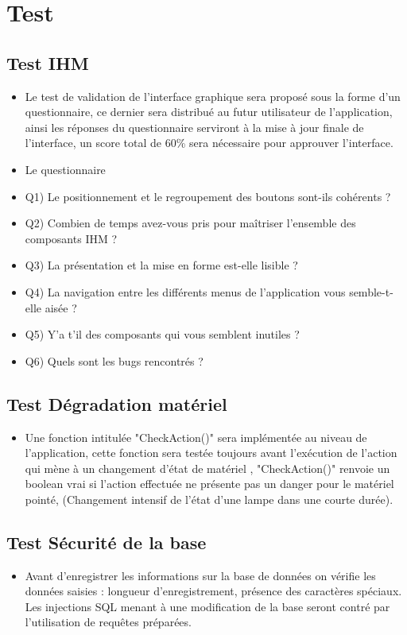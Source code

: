 \documentclass[12pt,a4paper]{article}
\begin{document}
\section{Test}

\subsection {Test IHM}

\begin{itemize}

  \item Le test de validation de l'interface graphique sera proposé sous la forme d'un questionnaire, ce dernier sera distribué au futur utilisateur de l'application, ainsi les réponses du questionnaire serviront à la mise à jour finale de l'interface, un score total de 60\% sera nécessaire pour approuver l'interface.	 
  \item Le questionnaire
  \item Q1) Le positionnement et le regroupement des boutons sont-ils cohérents ?
  \item Q2) Combien de temps avez-vous pris pour maîtriser l'ensemble des composants IHM ?
  \item Q3) La présentation et la mise en forme est-elle lisible ?
  \item Q4) La navigation entre les différents menus de l'application vous semble-t-elle aisée ?
  \item Q5) Y'a t'il des composants qui vous semblent inutiles ?
  \item Q6) Quels sont les bugs rencontrés ?

\end{itemize}
\subsection {Test Dégradation matériel}
\begin{itemize}
\item Une fonction intitulée "CheckAction()" sera implémentée au niveau de l'application, cette fonction sera testée toujours avant l'exécution de l'action qui mène à un changement d'état de matériel , "CheckAction()" renvoie un boolean vrai si l'action effectuée ne présente pas un danger pour le matériel pointé, (Changement intensif de l'état d'une lampe dans une courte durée).
\end{itemize}

\subsection {Test Sécurité de la base}
\begin{itemize}
\item Avant d'enregistrer les informations sur la base de données on vérifie les données saisies : longueur d'enregistrement, présence des caractères spéciaux. 
Les injections SQL menant à une modification de la base seront contré par l'utilisation de requêtes préparées.
\end{itemize}
\end{document}
